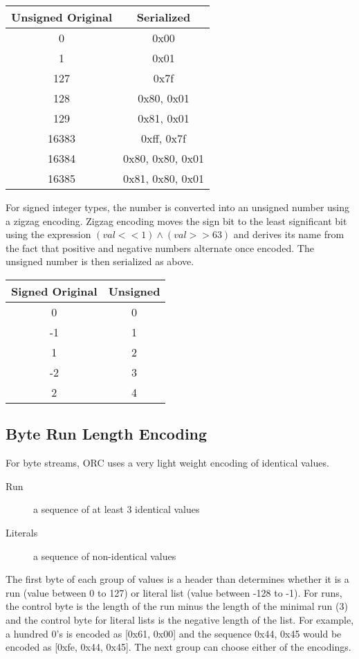 \documentclass{article}
\begin{document}
\vspace{10pt}
\begin{tabular}{| c | c |}
\hline
Unsigned Original & Serialized \\
\hline
0 & 0x00 \\
1 & 0x01 \\
127 & 0x7f \\
128 & 0x80, 0x01 \\
129 & 0x81, 0x01 \\
16383 & 0xff, 0x7f \\
16384 & 0x80, 0x80, 0x01 \\
16385 & 0x81, 0x80, 0x01 \\
\hline
\end{tabular}
\vspace{10pt}

For signed integer types, the number is converted into an unsigned
number using a zigzag encoding.  Zigzag encoding moves the sign bit to
the least significant bit using the expression $(val << 1) \wedge (val
>> 63)$ and derives its name from the fact that positive and negative
numbers alternate once encoded. The unsigned number is then serialized
as above.

\vspace{10pt}
\begin{tabular}{| c | c |}
\hline
Signed Original & Unsigned\\
\hline
0 & 0 \\
-1 & 1 \\
1 & 2 \\
-2 & 3 \\
2 & 4 \\
\hline
\end{tabular}

\subsection{Byte Run Length Encoding}
\label{byte-rle}

For byte streams, ORC uses a very light weight encoding of identical
values.

\begin{description}
\item[Run] a sequence of at least 3 identical values
\item[Literals] a sequence of non-identical values
\end{description}

The first byte of each group of values is a header than determines
whether it is a run (value between 0 to 127) or literal list (value
between -128 to -1). For runs, the control byte is the length of the
run minus the length of the minimal run (3) and the control byte for
literal lists is the negative length of the list. For example, a
hundred 0's is encoded as [0x61, 0x00] and the sequence 0x44, 0x45
would be encoded as [0xfe, 0x44, 0x45]. The next group can choose
either of the encodings.
\end{document}
